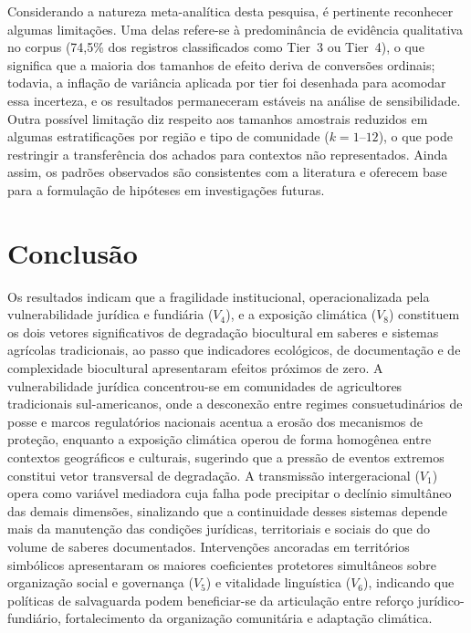Considerando a natureza meta-analítica desta pesquisa, é pertinente reconhecer algumas limitações. Uma delas refere-se à predominância de evidência qualitativa no corpus (74,5\% dos registros classificados como Tier~3 ou Tier~4), o que significa que a maioria dos tamanhos de efeito deriva de conversões ordinais; todavia, a inflação de variância aplicada por tier foi desenhada para acomodar essa incerteza, e os resultados permaneceram estáveis na análise de sensibilidade. Outra possível limitação diz respeito aos tamanhos amostrais reduzidos em algumas estratificações por região e tipo de comunidade ($k = 1$--$12$), o que pode restringir a transferência dos achados para contextos não representados. Ainda assim, os padrões observados são consistentes com a literatura e oferecem base para a formulação de hipóteses em investigações futuras.


\section{Conclusão}
\label{sec:conclusions_cap2}

Os resultados indicam que a fragilidade institucional, operacionalizada pela vulnerabilidade jurídica e fundiária ($V_4$), e a exposição climática ($V_8$) constituem os dois vetores significativos de degradação biocultural em saberes e sistemas agrícolas tradicionais, ao passo que indicadores ecológicos, de documentação e de complexidade biocultural apresentaram efeitos próximos de zero. A vulnerabilidade jurídica concentrou-se em comunidades de agricultores tradicionais sul-americanos, onde a desconexão entre regimes consuetudinários de posse e marcos regulatórios nacionais acentua a erosão dos mecanismos de proteção, enquanto a exposição climática operou de forma homogênea entre contextos geográficos e culturais, sugerindo que a pressão de eventos extremos constitui vetor transversal de degradação. A transmissão intergeracional ($V_1$) opera como variável mediadora cuja falha pode precipitar o declínio simultâneo das demais dimensões, sinalizando que a continuidade desses sistemas depende mais da manutenção das condições jurídicas, territoriais e sociais do que do volume de saberes documentados. Intervenções ancoradas em territórios simbólicos apresentaram os maiores coeficientes protetores simultâneos sobre organização social e governança ($V_5$) e vitalidade linguística ($V_6$), indicando que políticas de salvaguarda podem beneficiar-se da articulação entre reforço jurídico-fundiário, fortalecimento da organização comunitária e adaptação climática.

